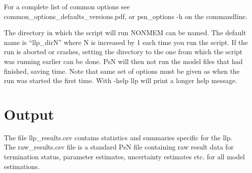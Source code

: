 For a complete list of common options see common\_options\_defaults\_versions.pdf, or psn\_options -h on the commandline.

\begin{optionlist}
The directory in which the script will run NONMEM can be named. The default name is “llp\_dirN” where N is increased by 1 each time you run the script. If the run is aborted or crashes, setting the directory to the one from which the script was running earlier can be done. PsN will then not run the model files that had finished, saving time. Note that same set of options must be given as when the run was started the first time. 
\nextopt
{}
With -help llp will print a longer help message. 
\nextopt
\end{optionlist}


\section{Output}

The file llp\_results.csv contains statistics and summaries specific for the llp. \\
The raw\_results.csv file is a standard PsN file containing raw result data for termination status, parameter estimates, uncertainty estimates etc. for all model estimations. 


